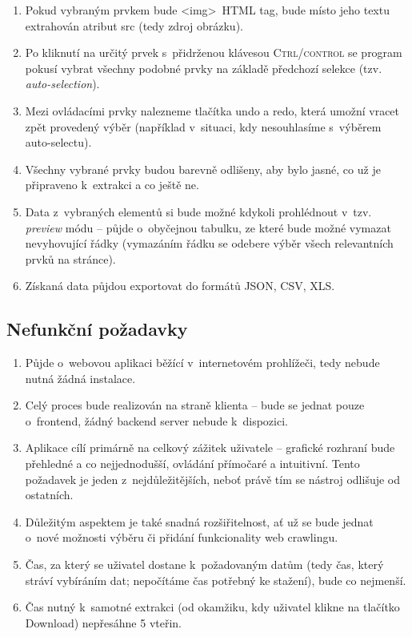 \documentclass[thesis=B,czech]{FITthesis}[2012/06/26]
\begin{document}
\begin{enumerate}[F1)]
\begin{enumerate}[F3.1)]
	\end{enumerate}
	\item Pokud vybraným prvkem bude \textless img\textgreater~HTML tag, bude místo jeho textu extrahován atribut \textsf{src} (tedy zdroj obrázku).
	\item Po kliknutí na určitý prvek s~přidrženou klávesou \textsc{Ctrl/control} se program pokusí vybrat všechny podobné prvky na základě předchozí selekce (tzv. \emph{auto-selection}).
	\item Mezi ovládacími prvky nalezneme tlačítka \textsf{undo} a \textsf{redo}, která umožní vracet zpět provedený výběr (například v~situaci, kdy nesouhlasíme s~výběrem auto-selectu).
	\item Všechny vybrané prvky budou barevně odlišeny, aby bylo jasné, co už je připraveno k~extrakci a co ještě ne.
	\item Data z~vybraných elementů si bude možné kdykoli prohlédnout v~tzv. \textit{preview} módu -- půjde o~obyčejnou tabulku, ze které bude možné vymazat nevyhovující řádky (vymazáním řádku se odebere výběr všech relevantních prvků na stránce).
	\item Získaná data půjdou exportovat do formátů JSON, CSV, XLS.
\end{enumerate}

\subsection{Nefunkční požadavky}
\begin{enumerate}[N1)]
	\item Půjde o~webovou aplikaci běžící v~internetovém prohlížeči, tedy nebude nutná žádná instalace.
	\item Celý proces bude realizován na straně klienta -- bude se jednat pouze o~frontend, žádný backend server nebude k~dispozici.
	\item Aplikace cílí primárně na celkový zážitek uživatele -- grafické rozhraní bude přehledné a co nejjednodušší, ovládání přímočaré a intuitivní. Tento požadavek je jeden z~nejdůležitějších, neboť právě tím se nástroj odlišuje od ostatních.
	\item Důležitým aspektem je také snadná rozšiřitelnost, ať už se bude jednat o~nové možnosti výběru či přidání funkcionality web crawlingu.
	\item Čas, za který se uživatel dostane k~požadovaným datům (tedy čas, který stráví vybíráním dat; nepočítáme čas potřebný ke stažení), bude co nejmenší.
	\item Čas nutný k~samotné extrakci (od okamžiku, kdy uživatel klikne na tlačítko \textsf{Download}) nepřesáhne 5 vteřin.
\end{enumerate}
\end{document}
